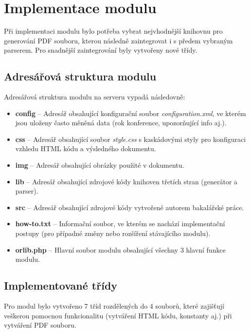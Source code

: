 \DeclarePairedDelimiter\ceil{\lceil}{\rceil}
\DeclarePairedDelimiter\floor{\lfloor}{\rfloor}

\chapter{Implementace modulu}
Při implementaci modulu bylo potřeba vybrat nejvhodnější knihovnu pro generování PDF souboru, kterou následně zaintegrovat i s předem vybraným parserem. Pro snadnější zaintegrování byly vytvořeny nové třídy.
\section{Adresářová struktura modulu}
Adresářová struktura modulu na serveru vypadá následovně:
\begin{itemize}
	\item \textbf{config} -- Adresář obsahující konfigurační soubor \textit{configuration.xml}, ve kterém jsou uloženy často měněná data (rok konference, upozorňující info aj.).  
	\item \textbf{css} --  Adresář obsahující soubor \textit{style.css} s kaskádovými styly pro konfiguraci vzhledu HTML kódu a výsledného dokumentu. 
	\item \textbf{img} -- Adresář obsahující obrázky použité v dokumentu.
	\item \textbf{lib} -- Adresář obsahující zdrojové kódy knihoven třetích stran (generátor a parser).
	\item \textbf{src} -- Adresář obsahující zdrojové kódy vytvořené autorem bakalářské práce.
	\item \textbf{how-to.txt} -- Informační soubor, ve kterém se nachází implementační postupy (pro případné změny nebo rozšíření stávajícího modulu).
	\item \textbf{orlib.php} -- Hlavní soubor modulu obsahující všechny 3 hlavní funkce modulu.
\end{itemize}
\section{Implementované třídy}
Pro modul bylo vytvořeno 7 tříd rozdělených do 4 souborů, které zajišťují veškerou pomocnou funkcionalitu (vytváření HTML kódu, konstanty aj.) při vytváření PDF souboru. 

